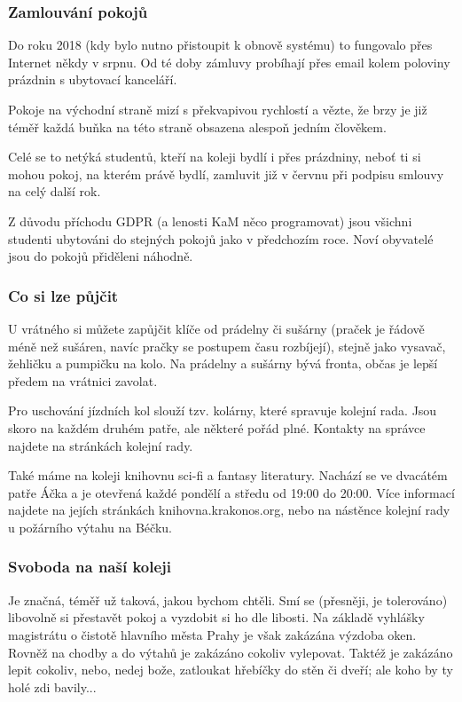 \subsubsection{Zamlouvání pokojů}
Do roku 2018 (kdy bylo nutno přistoupit k obnově systému) to fungovalo přes Internet někdy v srpnu.
Od té doby zámluvy probíhají přes email kolem poloviny prázdnin s ubytovací kanceláří.

Pokoje na východní straně mizí s překvapivou rychlostí a vězte,
že brzy je již téměř každá buňka na této straně obsazena alespoň jedním člověkem. 

Celé se to netýká studentů, kteří na koleji bydlí i přes prázdniny, neboť ti si
mohou pokoj, na kterém právě bydlí, zamluvit již v červnu při podpisu smlouvy na
celý další rok.

Z důvodu příchodu GDPR (a lenosti KaM něco programovat) jsou všichni studenti
ubytováni do stejných pokojů jako v předchozím roce. Noví obyvatelé jsou do
pokojů přiděleni náhodně.


\subsubsection{Co si lze půjčit}
U vrátného si můžete zapůjčit klíče od prádelny či sušárny (praček je řádově
méně než sušáren, navíc pračky se postupem času rozbíjejí), stejně jako vysavač,
žehličku a pumpičku na kolo. Na prádelny a sušárny bývá fronta, občas je lepší
předem na vrátnici zavolat.

Pro uschování jízdních kol slouží tzv. kolárny, které spravuje kolejní rada.
Jsou skoro na každém druhém patře, ale některé pořád plné. Kontakty na správce
najdete na stránkách kolejní rady.

Také máme na koleji knihovnu sci-fi a fantasy literatury. Nachází se ve dvacátém
patře Áčka a je otevřená každé pondělí a středu od 19:00 do 20:00. Více
informací najdete na jejích stránkách knihovna.krakonos.org, nebo na nástěnce
kolejní rady u požárního výtahu na Béčku.


\subsubsection{Svoboda na naší koleji}
Je značná, téměř už taková, jakou bychom chtěli. Smí se (přesněji, je
tolerováno) libovolně si přestavět pokoj a vyzdobit si ho dle libosti. Na
základě vyhlášky magistrátu o čistotě hlavního města Prahy je však zakázána
výzdoba oken. Rovněž na chodby a do výtahů je zakázáno cokoliv vylepovat. Taktéž
je zakázáno lepit cokoliv, nebo, nedej bože, zatloukat hřebíčky do stěn či
dveří; ale koho by ty holé zdi bavily...

